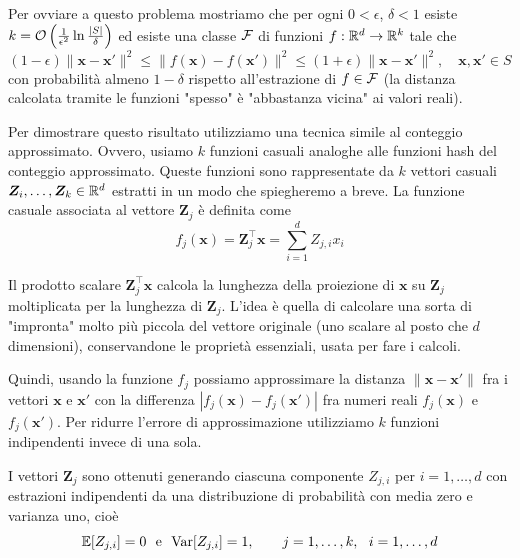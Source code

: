 Per ovviare a questo problema mostriamo che per ogni $0 < \epsilon$, $\delta < 1$ esiste $k = \mathcal{O} \left(\frac{1}{\epsilon^2} \ln \frac{|S|}{\delta}\right)$ ed esiste una classe $\mathcal{F}$ di funzioni $f: \mathbb{R}^d \rightarrow \mathbb{R}^k$ tale che
$$ \left(1 - \epsilon\right) \|\bm x - \bm x'\|^2 \leq \|f(\bm x) - f(\bm x') \|^2 \leq (1 + \epsilon) \| \bm x - \bm x' \|^2, \quad \bm x, \bm x' \in S $$
con probabilità almeno $1 - \delta$ rispetto all'estrazione di $f \in \mathcal{F}$ (la distanza calcolata tramite le funzioni "spesso" è "abbastanza vicina" ai valori reali).

Per dimostrare questo risultato utilizziamo una tecnica simile al conteggio approssimato. Ovvero, usiamo $k$ funzioni casuali analoghe alle funzioni hash del conteggio approssimato. Queste funzioni sono rappresentate da $k$ vettori casuali $\bm Z_i, \dots, \bm Z_k \in \mathbb{R}^d$ estratti in un modo che spiegheremo a breve. La funzione casuale associata al vettore $\bm Z_j$ è definita come
$$ f_j (\bm x) = \bm Z_j^\top \bm x = \sum_{i = 1}^d Z_{j,i} x_i $$

Il prodotto scalare $\bm Z_j^\top \bm x$ calcola la lunghezza della proiezione di $\bm x$ su $\bm Z_j$ moltiplicata per la lunghezza di $\bm Z_j$. L'idea è quella di calcolare una sorta di "impronta" molto più piccola del vettore originale (uno scalare al posto che $d$ dimensioni), conservandone le proprietà essenziali, usata per fare i calcoli.

Quindi, usando la funzione $f_j$ possiamo approssimare la distanza $\|\bm x - \bm x'\|$ fra i vettori $\bm x$ e $\bm x'$ con la differenza $|f_j(\bm x) - f_j (\bm x')|$ fra numeri reali $f_j (\bm x)$ e $f_j (\bm x')$. Per ridurre l'errore di approssimazione utilizziamo $k$ funzioni indipendenti invece di una sola.

I vettori $\bm Z_j$ sono ottenuti generando ciascuna componente $Z_{j,i}$ per $i = 1, \dots, d$ con estrazioni indipendenti da una distribuzione di probabilità con media zero e varianza uno, cioè
$$ \mathbb{E} [Z_{j,i}] = 0 \ \text{ e } \ \textnormal{Var} [Z_{j,i}] = 1, \qquad j = 1, \dots, k, \ \ i = 1, \dots, d $$

